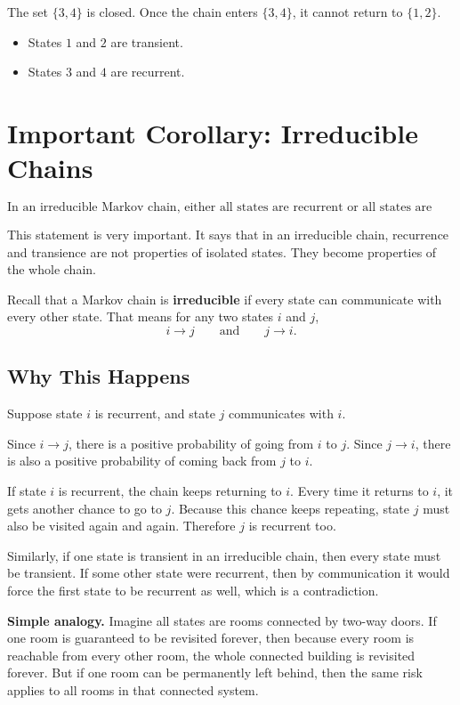 \documentclass[12pt,a4paper]{article}
\theoremstyle{notestyle}
\begin{document}
The set $\{3,4\}$ is closed. Once the chain enters $\{3,4\}$, it cannot return to $\{1,2\}$.

\begin{itemize}[leftmargin=1.2cm]
    \item States $1$ and $2$ are transient.
    \item States $3$ and $4$ are recurrent.
\end{itemize}

\section{Important Corollary: Irreducible Chains}

\[
\boxed{\text{In an irreducible Markov chain, either all states are recurrent or all states are transient.}}
\]

This statement is very important. It says that in an irreducible chain, recurrence and transience are not properties of isolated states. They become properties of the whole chain.

Recall that a Markov chain is \textbf{irreducible} if every state can communicate with every other state. That means for any two states $i$ and $j$,
\[
i\to j
\qquad\text{and}\qquad
j\to i.
\]

\subsection{Why This Happens}

Suppose state $i$ is recurrent, and state $j$ communicates with $i$.

Since $i\to j$, there is a positive probability of going from $i$ to $j$. Since $j\to i$, there is also a positive probability of coming back from $j$ to $i$.

If state $i$ is recurrent, the chain keeps returning to $i$. Every time it returns to $i$, it gets another chance to go to $j$. Because this chance keeps repeating, state $j$ must also be visited again and again. Therefore $j$ is recurrent too.

Similarly, if one state is transient in an irreducible chain, then every state must be transient. If some other state were recurrent, then by communication it would force the first state to be recurrent as well, which is a contradiction.

\textbf{Simple analogy.} Imagine all states are rooms connected by two-way doors. If one room is guaranteed to be revisited forever, then because every room is reachable from every other room, the whole connected building is revisited forever. But if one room can be permanently left behind, then the same risk applies to all rooms in that connected system.
\end{document}
